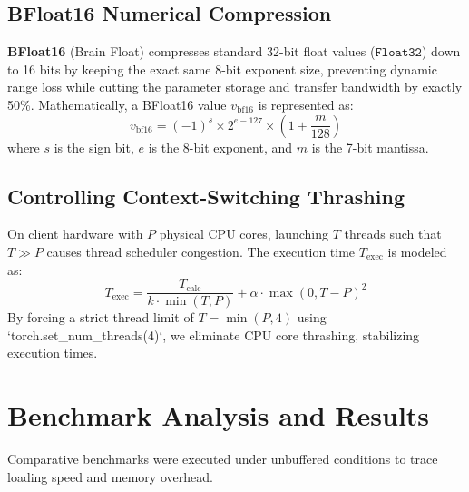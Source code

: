 \documentclass[twocolumn]{article}
\begin{document}
\subsection{BFloat16 Numerical Compression}
\textbf{BFloat16} (Brain Float) compresses standard 32-bit float values ($\mathtt{Float32}$) down to 16 bits by keeping the exact same 8-bit exponent size, preventing dynamic range loss while cutting the parameter storage and transfer bandwidth by exactly 50\%. Mathematically, a BFloat16 value $v_{\text{bf16}}$ is represented as:
\begin{equation}
v_{\text{bf16}} = (-1)^{s} \times 2^{e - 127} \times \left(1 + \frac{m}{128}\right)
\end{equation}
where $s$ is the sign bit, $e$ is the 8-bit exponent, and $m$ is the 7-bit mantissa.

\subsection{Controlling Context-Switching Thrashing}
On client hardware with $P$ physical CPU cores, launching $T$ threads such that $T \gg P$ causes thread scheduler congestion. The execution time $T_{\text{exec}}$ is modeled as:
\begin{equation}
T_{\text{exec}} = \frac{T_{\text{calc}}}{k \cdot \min(T, P)} + \alpha \cdot \max(0, T - P)^{2}
\end{equation}
By forcing a strict thread limit of $T = \min(P, 4)$ using `torch.set_num_threads(4)`, we eliminate CPU core thrashing, stabilizing execution times.

\section{Benchmark Analysis and Results}
Comparative benchmarks were executed under unbuffered conditions to trace loading speed and memory overhead.

\begin{table}[h]
\centering
\caption{Qwen3-TTS CPU Performance Benchmarks}
\end{table}
\end{document}
